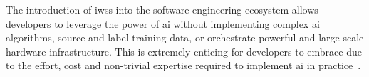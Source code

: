 The introduction of \glspl{iws} into the software engineering ecosystem allows developers to leverage the power of \gls{ai} without implementing complex \gls{ai} algorithms, source and label training data, or orchestrate powerful and large-scale hardware infrastructure. This is extremely enticing for developers to embrace due to the effort, cost and non-trivial expertise required to implement \gls{ai} in practice~\citep{Sculley2015, Polyzotis2018a}. 

